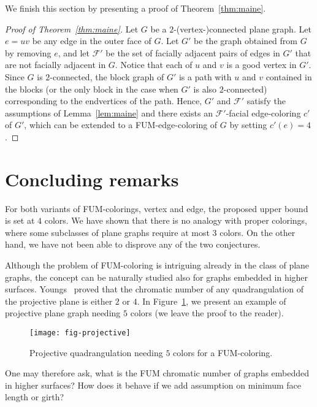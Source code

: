 \documentclass[a4paper,12pt]{article}
\newtheorem{proposition}{Proposition}
\begin{document}
We finish this section by presenting a proof of Theorem~\ref{thm:maine}.
\begin{proof}[Proof of Theorem~\ref{thm:maine}]
	Let $G$ be a $2$-(vertex-)connected plane graph.
	Let $e=uv$ be any edge in the outer face of $G$.
	Let $G'$ be the graph obtained from $G$ by removing $e$, and let $\mathcal{F}'$ be the set of facially adjacent pairs of edges in $G'$
	that are not facially adjacent in $G$.
	Notice that each of $u$ and $v$ is a good vertex in $G'$.
	Since $G$ is $2$-connected, the block graph of $G'$ is a path with $u$ and $v$ contained in the blocks (or the only block in the case when $G'$ is also $2$-connected)
	corresponding to the endvertices of the path.
	Hence, $G'$ and $\mathcal{F}'$ satisfy the assumptions of Lemma~\ref{lem:maine} and there exists
	an $\mathcal{F}'$-facial edge-coloring $c'$ of $G'$, which can be extended to a FUM-edge-coloring of $G$ by setting $c'(e) = 4$.
\end{proof}



\section{Concluding remarks}

For both variants of FUM-colorings, vertex and edge, the proposed upper bound is set at $4$ colors.
We have shown that there is no analogy with proper colorings, where some subclasses of plane graphs require at most $3$ colors.
On the other hand, we have not been able to disprove any of the two conjectures.

Although the problem of FUM-coloring is intriguing already in the class of plane graphs,
the concept can be naturally studied also for graphs embedded in higher surfaces. Youngs~\cite{You96}
proved that the chromatic number of any quadrangulation of the projective plane is either $2$ or $4$.
In Figure~\ref{fig:projective}, we present an example of projective plane graph needing $5$ colors (we leave the proof to the reader).
\begin{figure}[htp!]
	\begin{center}
		\texttt{[image: fig-projective]}
	\end{center}
	\caption{Projective quadrangulation needing $5$ colors for a FUM-coloring.}
	\label{fig:projective}	
\end{figure}
One may therefore ask, what is the FUM chromatic number of graphs embedded in higher surfaces?
How does it behave if we add assumption on minimum face length or girth?
\end{document}
